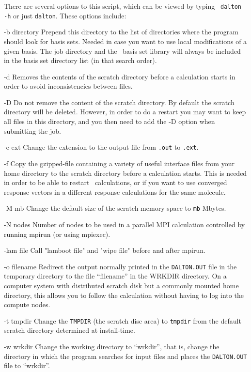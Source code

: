 There are several options to this script, which can be viewed by
typing \verb| dalton -h| or just \verb|dalton|. These options include:

\begin{list}{--}{}
\item[-b directory] Prepend this directory to the list of directories where the program
should look for basis sets. Needed in case you want to use local
modifications of a given basis. The job directory and the \dalton\ basis set library
will always be included in the basis set directory list (in that search order).
\item[-d] Removes the contents of the scratch directory before a
calculation starts in order to avoid inconsistencies between files.
\item[-D] Do not remove the content of the scratch directory. By
default the scratch directory will be deleted. However, in order to do
a restart you may want to keep all files in this directory, and you
then need to add the -D option when submitting the job.
\item[-e ext] Change the extension to the output file from \verb|.out|
to \verb|.ext|.
\item[-f] Copy the gzipped-file containing a variety of useful
  interface files from your home directory to the scratch directory
  before a calculation starts. This is needed in order to be able to
  restart \dalton\ calculations, or if you want to use converged response
  vectors in a different response calculations for the same molecule.
\item[-M mb] Change the default size of the scratch
memory space to \verb|mb| Mbytes.
\item[-N nodes] Number of nodes to be used in a parallel MPI calculation
controlled by running mpirun (or using mpiexec).
\item[-lam file] Call "lamboot file" and "wipe file" before and after mpirun.
\item[-o filename] Redirect the output normally printed in the
  \verb|DALTON.OUT| file in the temporary directory
  to the file ``filename'' in the WRKDIR
  directory. On a computer system with distributed scratch disk but a
  commonly mounted home directory, this allows you to follow the
  calculation without having to log into the compute nodes.
\item[-t tmpdir] Change the \verb|TMPDIR| (the scratch disc area) to
\verb|tmpdir| from the default scratch directory determined at
install-time.
\item[-w wrkdir] Change the working directory to ``wrkdir'', that is,
  change the directory in which the program searches for input files
  and places the \verb|DALTON.OUT| file to ``wrkdir''.
\end{list}

